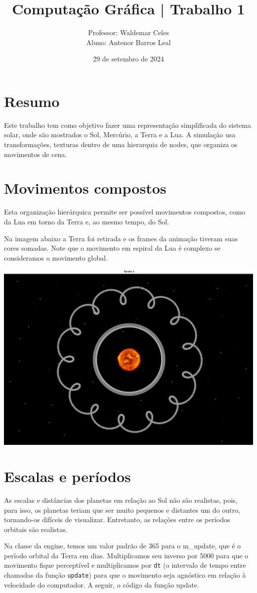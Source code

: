 \documentclass[11pt, a4paper]{article}
\title{Computação Gráfica | Trabalho 1}
\author{Professor: Waldemar Celes\\
Aluno: Antenor Barros Leal}
\date{29 de setembro de 2024}
\begin{document}
\maketitle

\section {Resumo}
Este trabalho tem como objetivo fazer uma representação simplificada do sistema 
solar, onde são mostrados o Sol, Mercúrio, a Terra e a Lua. A simulação 
usa transformações, texturas dentro de uma hierarquia de nodes, que organiza os
movimentos de cena.

\section {Movimentos compostos}
Esta organização hierárquica permite ser possível movimentos compostos, como da Lua em
torno da Terra e, ao mesmo tempo, do Sol.

Na imagem abaixo a Terra foi retirada e os frames da animação tiveram suas cores
somadas. Note que o movimento em espiral da Lua é complexo se consideramos o 
movimento global.

\includegraphics[width=0.7\linewidth]{overlay.png}


\section {Escalas e períodos}

As escalas e distâncias dos planetas em relação ao Sol não são realistas, pois, 
para isso, os planetas teriam que ser muito pequenos e distantes um do outro, 
tornando-os difíceis de visualizar. Entretanto, as relações entre os períodos 
orbitais são realistas.

Na classe da engine, temos um valor padrão de 365 para o m\_update, que é o período 
orbital da Terra em dias. Multiplicamos seu inverso por 5000 para que o movimento fique 
perceptível e multiplicamos por \texttt{dt} (o intervalo de tempo entre 
chamadas da função \texttt{update}) para que o movimento seja agnóstico em 
relação à velocidade do computador. A seguir, o código da função update.
\end{document}

